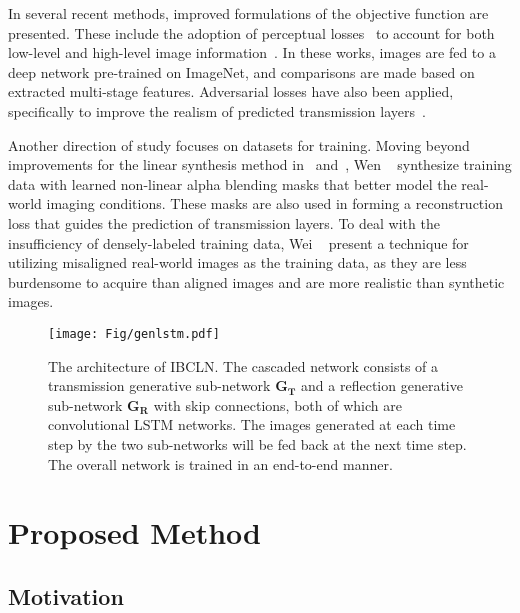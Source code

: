 \documentclass[10pt,twocolumn,letterpaper]{article}
\begin{document}
In several recent methods, improved formulations of the objective function are presented. These include the adoption of perceptual losses~\cite{johnson2016perceptual} to account for both low-level and high-level image information~\cite{chi2018single, jin2018learning, zhang2018single}. In these works, images are fed to a deep network pre-trained on ImageNet, and comparisons are made based on extracted multi-stage features. Adversarial losses have also been applied, specifically to improve the realism of predicted transmission layers~\cite{zhang2018single, lee2018generative, wen2019single, wei2019single}.


Another direction of study focuses on datasets for training. Moving beyond improvements for the linear synthesis method in~\cite{fan2017generic} and~\cite{zhang2018single}, Wen \etal~\cite{wen2019single} synthesize training data with learned non-linear alpha blending masks that better model the real-world imaging conditions. These masks are also used in forming a reconstruction loss that guides the prediction of transmission layers. To deal with the insufficiency of densely-labeled training data, Wei \etal~\cite{wei2019single} present a technique for utilizing misaligned real-world images as the training data, as they are less burdensome to acquire than aligned images and are more realistic than synthetic images.
\begin{figure*}[htbp]
    \begin{center}
    \texttt{[image: Fig/genlstm.pdf]}
    \end{center}
    \vspace{-0.5em}
    \caption{The architecture of IBCLN. The cascaded network consists of a transmission generative sub-network $\bm{G_T}$ and a reflection generative sub-network $\bm{G_R}$ with skip connections, both of which are convolutional LSTM networks. The images generated at each time step by the two sub-networks will be fed back at the next time step. The overall network is trained in an end-to-end manner.
    }
    \vspace{-0.5em}
    \label{fig:network}
\end{figure*}

\section{Proposed Method}

\subsection{Motivation} \label{sec:motivation}
\end{document}
